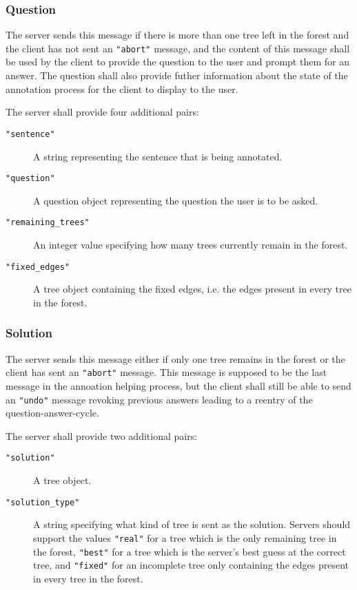 \documentclass{scrartcl}
\newcommand{\jsstring}[1]{\texttt{\color{OrangeRed}"#1"}}
\begin{document}
\subsubsection{Question}
\label{ssub:Question}

The server sends this message if there is more than one tree left in the forest and the client has not sent an \jsstring{abort} message,
and the content of this message shall be used by the client to provide the question to the user and prompt them for an answer.
The question shall also provide futher information about the state of the annotation process for the client to display to the user.

The server shall provide four additional pairs:
\begin{description}
    \item[\jsstring{sentence}] A string representing the sentence that is being annotated.
    \item[\jsstring{question}] A question object representing the question the user is to be asked.
    \item[\jsstring{remaining\_trees}] An integer value specifying how many trees currently remain in the forest.
    \item[\jsstring{fixed\_edges}] A tree object containing the fixed edges, i.e. the edges present in every tree in the forest.
\end{description}

\subsubsection{Solution}
\label{ssub:Solution}

The server sends this message either if only one tree remains in the forest or the client has sent an \jsstring{abort} message.
This message is supposed to be the last message in the annoation helping process, but the client shall still be able to send an \jsstring{undo} message revoking previous answers leading to a reentry of the question-answer-cycle.

The server shall provide two additional pairs:
\begin{description}
    \item[\jsstring{solution}] A tree object.
    \item[\jsstring{solution\_type}] A string specifying what kind of tree is sent as the solution.
        Servers should support the values \jsstring{real} for a tree which is the only remaining tree in the forest, \jsstring{best} for a tree which is the server’s best guess at the correct tree, and \jsstring{fixed} for an incomplete tree only containing the edges present in every tree in the forest.
\end{description}
\end{document}
